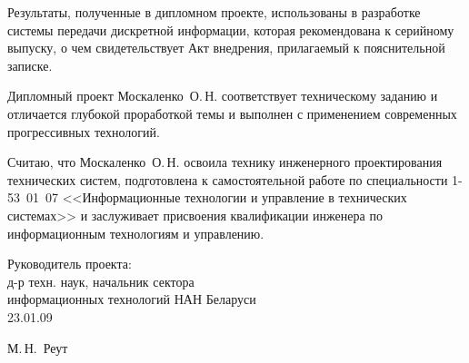 \begin{singlespace}
{Результаты, полученные в дипломном проекте, использованы в разработке системы передачи дискретной информации, которая рекомендована к серийному выпуску, о чем свидетельствует Акт внедрения, прилагаемый к пояснительной записке.

Дипломный проект Москаленко~О.\,Н. соответствует техническому заданию и отличается глубокой проработкой темы и выполнен с применением современных прогрессивных технологий.

Считаю, что Москаленко~О.\,Н. освоила технику инженерного проектирования технических систем, подготовлена к самостоятельной работе по специальности 1-53~01~07
<<Информационные технологии и управление в технических системах>> и заслуживает присвоения квалификации инженера по информационным технологиям и управлению.

  \vfill
  \noindent
  \begin{minipage}{0.54\textwidth}
    \begin{flushleft}
      Руководитель проекта:\\
      д-р техн. наук, начальник сектора \\
      информационных технологий НАН Беларуси\\
      23.01.09
    \end{flushleft}
  \end{minipage}
  \begin{minipage}{0.44\textwidth}
    \begin{flushright}
      \underline{\hspace*{3cm}} М.\,Н.~Реут
    \end{flushright}
  \end{minipage}
}

\end{singlespace}

\clearpage